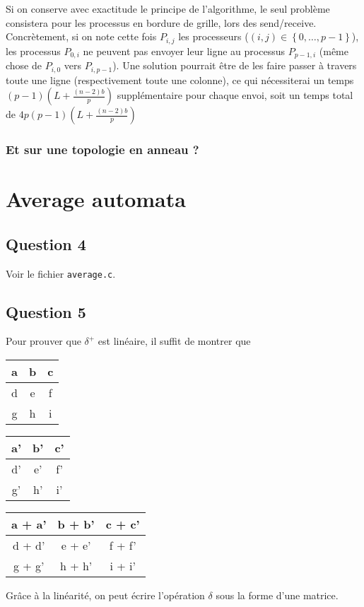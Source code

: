 \documentclass{article}
\begin{document}
Si on conserve avec exactitude le principe de l'algorithme, le seul problème consistera pour les processus en bordure de grille, lors des send/receive.
Concrètement, si on note cette fois $P_{i,j}$ les processeurs ($(i,j) \in \left\{ 0, \dots,p-1\right\}$), les processus $P_{0,i}$ ne peuvent pas envoyer leur ligne au processus $P_{p-1,i}$ (même chose de $P_{i,0}$ vers $P_{i,p-1}$).
Une solution pourrait être de les faire passer à travers toute une ligne (respectivement toute une colonne), ce qui nécessiterai un temps $(p-1)(L + \frac{(n-2)b}{p})$ supplémentaire pour chaque envoi, soit un temps total de $4p(p-1)(L + \frac{(n-2)b}{p})$

\subsubsection*{Et sur une topologie en anneau ?}

\section{Average automata}

\subsection*{Question 4} 

Voir le fichier \texttt{average.c}.

\subsection*{Question 5}


Pour prouver que $\delta^+$ est linéaire, il suffit de montrer que \\
\begin{tabular}{|c|c|c|}
 \hline
 a & b & c \\
 \hline
 d & e & f \\
 \hline 
 g & h & i \\
 \hline
\end{tabular}  
 
\begin{tabular}{|c|c|c|}
 \hline
 a' & b' & c' \\
 \hline
 d' & e' & f' \\
 \hline 
 g' & h' & i' \\
 \hline
\end{tabular}  




\begin{tabular}{|c|c|c|}
 \hline
 a + a' & b + b' & c + c' \\
 \hline
 d + d' & e + e' & f + f' \\
 \hline 
 g + g' & h + h' & i + i' \\
 \hline
\end{tabular}  


Grâce à la linéarité, on peut écrire l'opération $\delta$ sous la forme d'une matrice. %
\end{document}
